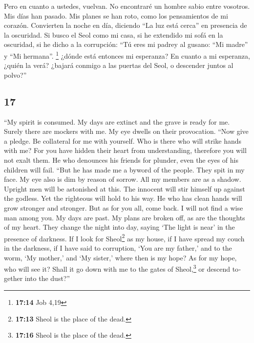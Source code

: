 \begin{paracol}{2}
 Pero en cuanto a ustedes, vuelvan. No encontraré un
hombre sabio entre vosotros.  Mis días han pasado. Mis
planes se han roto, como los pensamientos de mi corazón. 
Convierten la noche en día, diciendo ``La luz está cerca'' en presencia
de la oscuridad.  Si busco el Seol como mi casa, si he
extendido mi sofá en la oscuridad,  si he dicho a la
corrupción: ``Tú eres mi padrey al gusano: ``Mi madre'' y ``Mi
hermana''. \footnote{\textbf{17:14} Job 4,19}  ¿dónde
está entonces mi esperanza? En cuanto a mi esperanza, ¿quién la verá?
 ¿bajará conmigo a las puertas del Seol, o descender
juntos al polvo?''

\switchcolumn
\begin{otherlanguage}{english}

\hypertarget{section-33}{%
\section{17}\label{section-33}}

 ``My spirit is consumed. My days are extinct and the
grave is ready for me.  Surely there are mockers with me.
My eye dwells on their provocation.  ``Now give a pledge.
Be collateral for me with yourself. Who is there who will strike hands
with me?  For you have hidden their heart from
understanding, therefore you will not exalt them.  He who
denounces his friends for plunder, even the eyes of his children will
fail.  ``But he has made me a byword of the people. They
spit in my face.  My eye also is dim by reason of sorrow.
All my members are as a shadow.  Upright men will be
astonished at this. The innocent will stir himself up against the
godless.  Yet the righteous will hold to his way. He who
has clean hands will grow stronger and stronger.  But as
for you all, come back. I will not find a wise man among you.
 My days are past. My plans are broken off, as are the
thoughts of my heart.  They change the night into day,
saying `The light is near' in the presence of darkness. 
If I look for Sheol\footnote{\textbf{17:13} Sheol is the place of the
  dead.} as my house, if I have spread my couch in the darkness,
 if I have said to corruption, `You are my father,' and
to the worm, `My mother,' and `My sister,'  where then is
my hope? As for my hope, who will see it?  Shall it go
down with me to the gates of Sheol,\footnote{\textbf{17:16} Sheol is the
  place of the dead.} or descend together into the dust?''


\end{otherlanguage}
\end{paracol}
